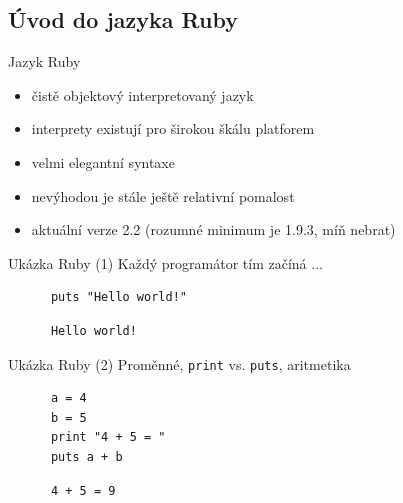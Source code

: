 \documentclass{beamer}
\begin{document}
\subsection{Úvod do jazyka Ruby}

\begin{frame}{Jazyk Ruby}
  \begin{itemize}
    \item čistě objektový interpretovaný jazyk
    \item interprety existují pro širokou škálu platforem
    \item velmi elegantní syntaxe
    \item nevýhodou je stále ještě relativní pomalost
    \item aktuální verze 2.2 (rozumné minimum je 1.9.3, míň nebrat)
  \end{itemize}
\end{frame}

\begin{frame}[fragile]{Ukázka Ruby (1)}
  Každý programátor tím začíná ...
  \begin{block}{}
    \smallskip \footnotesize
    {\scriptsize \begin{verbatim}
      puts "Hello world!"
    \end{verbatim}}
  \end{block}
  \pause
  \begin{block}{}
    \smallskip \footnotesize
    {\scriptsize \begin{verbatim}
      Hello world!
    \end{verbatim}}
  \end{block}
\end{frame}

\begin{frame}[fragile]{Ukázka Ruby (2)}
  Proměnné, \texttt{print} vs. \texttt{puts}, aritmetika
  \begin{block}{}
    \smallskip \footnotesize
    {\scriptsize \begin{verbatim}
      a = 4
      b = 5
      print "4 + 5 = "
      puts a + b
    \end{verbatim}}
  \end{block}
  \pause
  \begin{block}{}
    \smallskip \footnotesize
    {\scriptsize \begin{verbatim}
      4 + 5 = 9
    \end{verbatim}}
  \end{block}
\end{frame}
\end{document}
